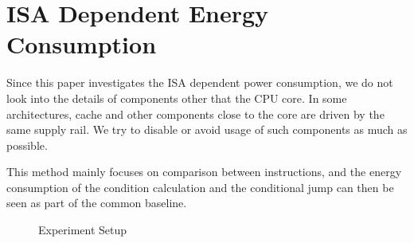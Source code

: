 \section{ISA Dependent Energy Consumption}

Since this paper investigates the ISA dependent power consumption, we do not
look into the details of components other that the CPU core. In some
architectures, cache and other components close to the core are driven by the
same supply rail\cite{rusu200765}. We try to disable or avoid usage of such
components as much as possible.


This method mainly focuses on comparison between instructions, and the energy
consumption of the condition calculation and the conditional jump can then be
seen as part of the common baseline.

\begin{figure}
    
    \caption{Experiment Setup}
    \label{fig:setup}
\end{figure}


